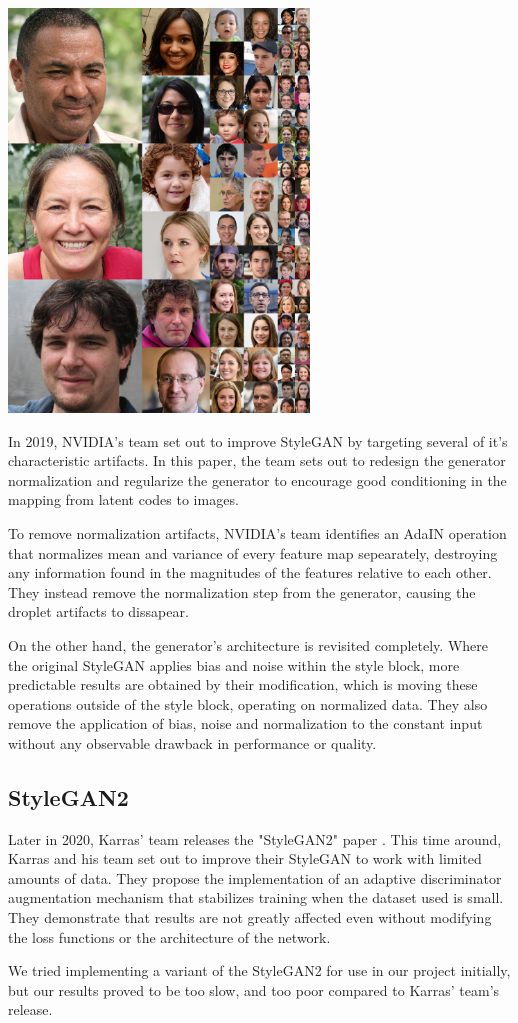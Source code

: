 \begin{Figure}[h]
 \centering
 \includegraphics[width=8cm]{resources/styleface.png}
 \label{fig:style_face}
\end{Figure}

In 2019, NVIDIA's team set out to improve StyleGAN by targeting several of it's characteristic artifacts\cite{DBLP:journals/corr/abs-1912-04958}. In this paper, the team sets out to redesign the generator normalization and regularize the generator to encourage good conditioning in the mapping from latent codes to images. 

To remove normalization artifacts, NVIDIA's team identifies an AdaIN operation that normalizes mean and variance of every feature map sepearately, destroying any information found in the magnitudes of the features relative to each other. They instead remove the normalization step from the generator, causing the droplet artifacts to dissapear.

On the other hand, the generator's architecture is revisited completely. Where the original StyleGAN applies bias and noise within the style block, more predictable results are obtained by their modification, which is moving these operations outside of the style block, operating on normalized data. They also remove the application of bias, noise and normalization to the constant input without any observable drawback in performance or quality.

\subsection{StyleGAN2}
Later in 2020, Karras' team releases the "StyleGAN2" paper \cite{DBLP:journals/corr/abs-2006-06676}. This time around, Karras and his team set out to improve their StyleGAN to work with limited amounts of data. They propose the implementation of an adaptive discriminator augmentation mechanism that stabilizes training when the dataset used is small. They demonstrate that results are not greatly affected even without modifying the loss functions or the architecture of the network.

We tried implementing a variant of the StyleGAN2 for use in our project initially, but our results proved to be too slow, and too poor compared to Karras' team's release. 
